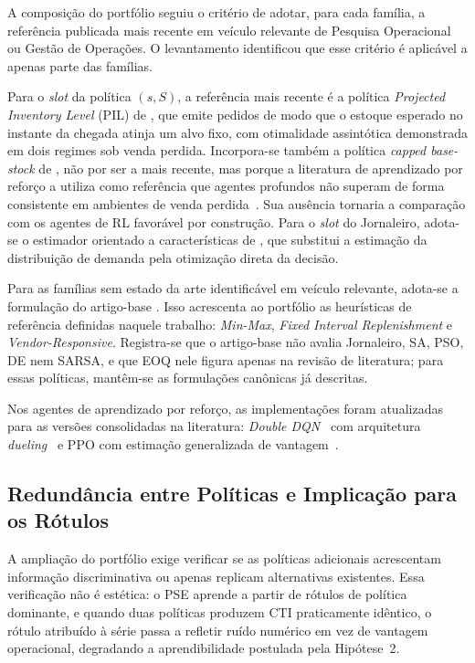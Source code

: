 A composição do portfólio seguiu o critério de adotar, para cada família, a referência publicada mais recente em veículo relevante de Pesquisa Operacional ou Gestão de Operações. O levantamento identificou que esse critério é aplicável a apenas parte das famílias.

Para o \textit{slot} da política $(s,S)$, a referência mais recente é a política \textit{Projected Inventory Level} (PIL) de \citet{VanJaarsveldArts2024PIL}, que emite pedidos de modo que o estoque esperado no instante da chegada atinja um alvo fixo, com otimalidade assintótica demonstrada em dois regimes sob venda perdida. Incorpora-se também a política \textit{capped base-stock} de \citet{Xin2021CappedBaseStock}, não por ser a mais recente, mas porque a literatura de aprendizado por reforço a utiliza como referência que agentes profundos não superam de forma consistente em ambientes de venda perdida~\citep{Temizoz2025DeepControlledLearning}. Sua ausência tornaria a comparação com os agentes de RL favorável por construção. Para o \textit{slot} do Jornaleiro, adota-se o estimador orientado a características de \citet{BanRudin2019BigDataNewsvendor}, que substitui a estimação da distribuição de demanda pela otimização direta da decisão.

Para as famílias sem estado da arte identificável em veículo relevante, adota-se a formulação do artigo-base \citep{Zabraoui2025GaDQN}. Isso acrescenta ao portfólio as heurísticas de referência definidas naquele trabalho: \textit{Min-Max}, \textit{Fixed Interval Replenishment} e \textit{Vendor-Responsive}. Registra-se que o artigo-base não avalia Jornaleiro, SA, PSO, DE nem SARSA, e que EOQ nele figura apenas na revisão de literatura; para essas políticas, mantêm-se as formulações canônicas já descritas.

Nos agentes de aprendizado por reforço, as implementações foram atualizadas para as versões consolidadas na literatura: \textit{Double DQN}~\citep{VanHasselt2016DoubleDQN} com arquitetura \textit{dueling}~\citep{Wang2016DuelingDQN} e PPO com estimação generalizada de vantagem~\citep{Schulman2016GAE}.

\subsection{Redundância entre Políticas e Implicação para os Rótulos}
\label{sec:redundancia_portfolio}

A ampliação do portfólio exige verificar se as políticas adicionais acrescentam informação discriminativa ou apenas replicam alternativas existentes. Essa verificação não é estética: o PSE aprende a partir de rótulos de política dominante, e quando duas políticas produzem CTI praticamente idêntico, o rótulo atribuído à série passa a refletir ruído numérico em vez de vantagem operacional, degradando a aprendibilidade postulada pela Hipótese~2.

